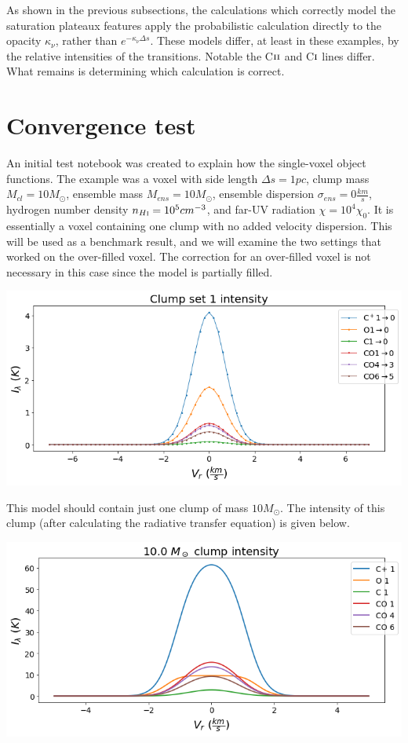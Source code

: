 \documentclass[a4paper]{article}
\newcommand{\mathsc}[1]{{\normalfont\textsc{#1}}}
\begin{document}
    As shown in the previous subsections, the calculations which correctly model the saturation plateaux features apply the probabilistic calculation directly to the opacity \(\kappa_\nu\), rather than \(e^{-\kappa_\nu \Delta s}\).
    These models differ, at least in these examples, by the relative intensities of the transitions.
    Notable the C\(\mathsc{ii}\) and C\(\mathsc{i}\) lines differ.
    What remains is determining which calculation is correct.

    \pagebreak

    \section{Convergence test}

    An initial test notebook was created to explain how the single-voxel object functions.
    The example was a voxel with side length \(\Delta s = 1 pc\), clump mass \(M_{cl} = 10 M_\odot\), ensemble mass \(M_{ens} = 10 M_\odot\), ensemble dispersion \(\sigma_{ens} = 0 \frac{km}{s}\), hydrogen number density \(n_{H\mathsc{i}} = 10^{5} cm^{-3}\), and far-UV radiation \(\chi = 10^{4} \chi_0\).
    It is essentially a voxel containing one clump with no added velocity dispersion.
    This will be used as a benchmark result, and we will examine the two settings that worked on the over-filled voxel.
    The correction for an over-filled voxel is not necessary in this case since the model is partially filled.

    \includegraphics*[width=\linewidth]{voxel_convergence_original.png}

    This model should contain just one clump of mass \(10 M_\odot\).
    The intensity of this clump (after calculating the radiative transfer equation) is given below.

    \includegraphics*[width=\linewidth]{voxel_single-clump.png}
\end{document}
